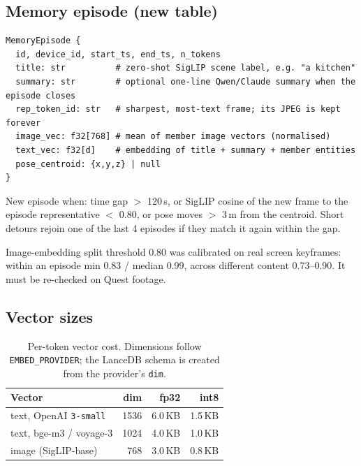 \documentclass[11pt,a4paper]{article}
\begin{document}
\subsection{Memory episode (new table)}
\begin{lstlisting}
MemoryEpisode {
  id, device_id, start_ts, end_ts, n_tokens
  title: str          # zero-shot SigLIP scene label, e.g. "a kitchen"
  summary: str        # optional one-line Qwen/Claude summary when the episode closes
  rep_token_id: str   # sharpest, most-text frame; its JPEG is kept forever
  image_vec: f32[768] # mean of member image vectors (normalised)
  text_vec: f32[d]    # embedding of title + summary + member entities
  pose_centroid: {x,y,z} | null
}
\end{lstlisting}
\noindent New episode when: time gap $>$ 120\,s, or SigLIP cosine of the new frame to the episode representative $<$ 0.80, or pose moves $>$ 3\,m from the centroid. Short detours rejoin one of the last 4 episodes if they match it again within the gap.
\begin{measured}
Image-embedding split threshold 0.80 was calibrated on real screen keyframes: within an episode min 0.83 / median 0.99, across different content 0.73--0.90. It must be re-checked on Quest footage.
\end{measured}

\subsection{Vector sizes}
\begin{table}[h]\centering\small
\begin{tabular}{lrrr}\toprule
\textbf{Vector} & \textbf{dim} & \textbf{fp32} & \textbf{int8}\\\midrule
text, OpenAI \texttt{3-small} & 1536 & 6.0\,KB & 1.5\,KB\\
text, bge-m3 / voyage-3 & 1024 & 4.0\,KB & 1.0\,KB\\
image (SigLIP-base) & 768 & 3.0\,KB & 0.8\,KB\\\bottomrule
\end{tabular}
\caption{Per-token vector cost. Dimensions follow \texttt{EMBED\_PROVIDER}; the LanceDB schema is created from the provider's \texttt{dim}.}
\end{table}

\end{document}
